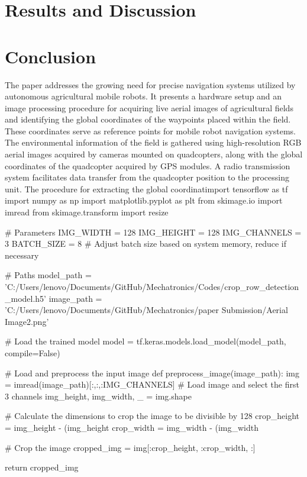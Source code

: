 \documentclass[conference]{IEEEtran}
\begin{document}
\section{Results and Discussion}\label{Results and Discussion}




\section{Conclusion}\label{Conclusion}
The paper addresses the growing need for precise navigation systems utilized by autonomous agricultural mobile robots. It presents a hardware setup and an image processing procedure for acquiring live aerial images of agricultural fields and identifying the global coordinates of the waypoints placed within the field. These coordinates serve as reference points for mobile robot navigation systems. The environmental information of the field is gathered using high-resolution RGB aerial images acquired by cameras mounted on quadcopters, along with the global coordinates of the quadcopter acquired by GPS modules. A radio transmission system facilitates data transfer from the quadcopter position to the processing unit. The procedure for extracting the global coordinatimport tensorflow as tf
import numpy as np
import matplotlib.pyplot as plt
from skimage.io import imread
from skimage.transform import resize

# Parameters
IMG_WIDTH = 128
IMG_HEIGHT = 128
IMG_CHANNELS = 3
BATCH_SIZE = 8  # Adjust batch size based on system memory, reduce if necessary

# Paths
model_path = 'C:/Users/lenovo/Documents/GitHub/Mechatronics/Codes/crop_row_detection_model.h5'
image_path = 'C:/Users/lenovo/Documents/GitHub/Mechatronics/paper Submission/Aerial Image2.png'

# Load the trained model
model = tf.keras.models.load_model(model_path, compile=False)

# Load and preprocess the input image
def preprocess_image(image_path):
img = imread(image_path)[:,:,:IMG_CHANNELS]  # Load image and select the first 3 channels
img_height, img_width, _ = img.shape

# Calculate the dimensions to crop the image to be divisible by 128
crop_height = img_height - (img_height %
crop_width = img_width - (img_width %

# Crop the image
cropped_img = img[:crop_height, :crop_width, :]

return cropped_img
\end{document}
